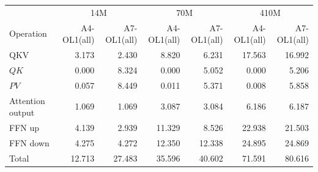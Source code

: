 \begin{tabular}{@{}lrrrrrr@{}}
\toprule
& \multicolumn{2}{c}{14M} & \multicolumn{2}{c}{70M} & \multicolumn{2}{c}{410M} \\ Operation & A4-OL1(all) & A7-OL1(all) & A4-OL1(all) & A7-OL1(all) & A4-OL1(all) & A7-OL1(all) \\
\midrule
QKV & 3.173 & 2.430 & 8.820 & 6.231 & 17.563 & 16.992 \\
$QK$ & 0.000 & 8.324 & 0.000 & 5.052 & 0.000 & 5.206 \\
$PV$ & 0.057 & 8.449 & 0.011 & 5.371 & 0.008 & 5.858 \\
Attention output & 1.069 & 1.069 & 3.087 & 3.084 & 6.186 & 6.187 \\
FFN up & 4.139 & 2.939 & 11.329 & 8.526 & 22.938 & 21.503 \\
FFN down & 4.275 & 4.272 & 12.350 & 12.338 & 24.895 & 24.869 \\
Total & 12.713 & 27.483 & 35.596 & 40.602 & 71.591 & 80.616 \\
\bottomrule
\end{tabular}
